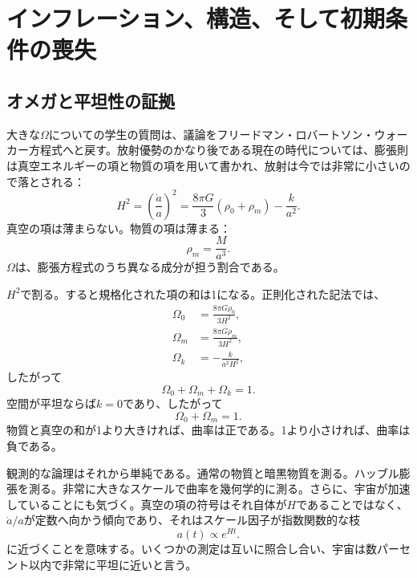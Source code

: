 \chapter{インフレーション、構造、そして初期条件の喪失}

\section{オメガと平坦性の証拠}

大きな\(\Omega\)についての学生の質問は、議論をフリードマン・ロバートソン・ウォーカー方程式へと戻す。放射優勢のかなり後である現在の時代については、膨張則は真空エネルギーの項と物質の項を用いて書かれ、放射は今では非常に小さいので落とされる：
\begin{equation}
H^2=\left(\frac{\dot a}{a}\right)^2=\frac{8\pi G}{3}\left(\rho_0+\rho_m\right)-\frac{k}{a^2}.
\end{equation}
真空の項は薄まらない。物質の項は薄まる：
\begin{equation}
\rho_m=\frac{M}{a^3}.
\end{equation}
\(\Omega\)は、膨張方程式のうち異なる成分が担う割合である。

\(H^2\)で割る。すると規格化された項の和は1になる。正則化された記法では、
\begin{equation}
\begin{aligned}
\Omega_0&=\frac{8\pi G\rho_0}{3H^2},\\
\Omega_m&=\frac{8\pi G\rho_m}{3H^2},\\
\Omega_k&=-\frac{k}{a^2H^2},
\end{aligned}
\end{equation}
したがって
\begin{equation}
\Omega_0+\Omega_m+\Omega_k=1.
\end{equation}
空間が平坦ならば\(k=0\)であり、したがって
\begin{equation}
\Omega_0+\Omega_m=1.
\end{equation}
物質と真空の和が1より大きければ、曲率は正である。1より小さければ、曲率は負である。

観測的な論理はそれから単純である。通常の物質と暗黒物質を測る。ハッブル膨張を測る。非常に大きなスケールで曲率を幾何学的に測る。さらに、宇宙が加速していることにも気づく。真空の項の符号はそれ自体が\(H\)であることではなく、\(\dot a/a\)が定数へ向かう傾向であり、それはスケール因子が指数関数的な枝
\begin{equation}
a(t)\propto e^{Ht}.
\end{equation}
に近づくことを意味する。いくつかの測定は互いに照合し合い、宇宙は数パーセント以内で非常に平坦に近いと言う。


